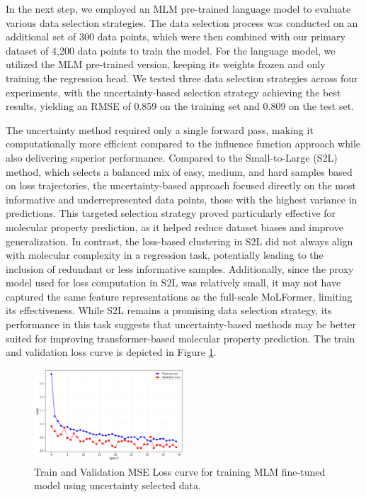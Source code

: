 \documentclass[11pt]{article}
\begin{document}
In the next step, we employed an MLM pre-trained language model to evaluate various data selection strategies. The data selection process was conducted on an additional set of 300 data points, which were then combined with our primary dataset of 4,200 data points to train the model. For the language model, we utilized the MLM pre-trained version, keeping its weights frozen and only training the regression head. We tested three data selection strategies across four experiments, with the uncertainty-based selection strategy achieving the best results, yielding an RMSE of 0.859 on the training set and 0.809 on the test set.


The uncertainty method required only a single forward pass, making it computationally more efficient compared to the influence function approach while also delivering superior performance. Compared to the Small-to-Large (S2L) method, which selects a balanced mix of easy, medium, and hard samples based on loss trajectories, the uncertainty-based approach focused directly on the most informative and underrepresented data points, those with the highest variance in predictions. This targeted selection strategy proved particularly effective for molecular property prediction, as it helped reduce dataset biases and improve generalization. In contrast, the loss-based clustering in S2L did not always align with molecular complexity in a regression task, potentially leading to the inclusion of redundant or less informative samples. Additionally, since the proxy model used for loss computation in S2L was relatively small, it may not have captured the same feature representations as the full-scale MoLFormer, limiting its effectiveness. While S2L remains a promising data selection strategy, its performance in this task suggests that uncertainty-based methods may be better suited for improving transformer-based molecular property prediction. The train and validation loss curve is depicted in Figure \ref{fig:uncertainty}.



\begin{figure}[htbp]
    \centering
    \includegraphics[width=0.5\textwidth]{LM_Uncertainty.png} 
    \caption{Train and Validation MSE Loss curve for training MLM fine-tuned model using uncertainty selected data.} %
    \label{fig:uncertainty} 
\end{figure}
\end{document}
